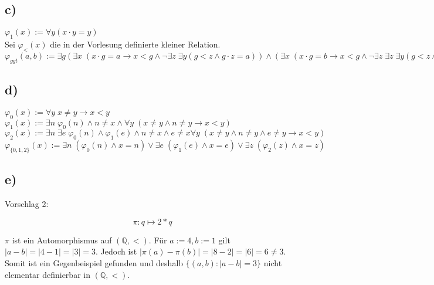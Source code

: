 \documentclass[11pt, a4paper]{article}
\renewcommand{\v}{\vee}
\newcommand{\n}{\wedge}
\begin{document}
\subsection*{c)}
$\varphi_1(x) := \forall y (x \cdot y = y)$\\
Sei $\varphi_{<}(x)$ die in der Vorlesung definierte kleiner Relation.\\
$\varphi_{ggt}(a,b) := \exists g (\exists x \; (x \cdot g = a \rightarrow x < g \n \neg \exists z \; \exists y (g < z \n g \cdot z = a))
\n (\exists x \; (x \cdot g = b \rightarrow x < g \n \neg \exists z \; \exists z \; \exists y (g < z \n g \cdot z = b) )) )$


\subsection*{d)}
$\varphi_0(x) := \forall y \; x \neq y \rightarrow x < y$\\
$\varphi_1(x) := \exists n \; \varphi_0(n) \n n \neq x \n \forall y \; (x \neq y \n n \neq y \rightarrow x < y)$\\
$\varphi_2(x) := \exists n \; \exists e \; \varphi_0(n) \n \varphi_1(e) \n n \neq x \n e \neq x \forall y \; (x \neq y \n n \neq y \n e \neq y \rightarrow x < y)$\\

$\varphi_{\{0,1,2\}}(x) := \exists n \;(\varphi_0(n) \n x = n) \v \exists e \;(\varphi_1(e) \n x = e) \v \exists z \;(\varphi_2(z) \n x = z)$

\subsection*{e)}


Vorschlag 2:


\[ \pi: q \mapsto 2*q \]

$\pi$ ist ein Automorphismus auf $(\mathbb{Q}, <)$.
Für $a := 4, b := 1$ gilt $|a - b| = |4 - 1| = |3| = 3$.
Jedoch ist $|\pi(a) - \pi(b)| = |8 - 2| = |6| = 6 \neq 3$.
Somit ist ein Gegenbeispiel gefunden und deshalb $\{(a,b) : |a-b| = 3\}$ nicht elementar definierbar in $(\mathbb{Q},<)$.
\end{document}
